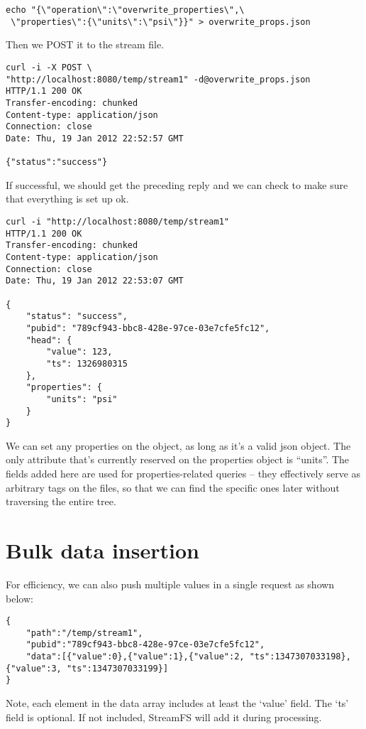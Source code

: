 \begin{lstlisting}
echo "{\"operation\":\"overwrite_properties\",\
 \"properties\":{\"units\":\"psi\"}}" > overwrite_props.json
\end{lstlisting}

Then we POST it to the stream file.

\begin{lstlisting}
curl -i -X POST \
"http://localhost:8080/temp/stream1" -d@overwrite_props.json
HTTP/1.1 200 OK
Transfer-encoding: chunked
Content-type: application/json
Connection: close
Date: Thu, 19 Jan 2012 22:52:57 GMT

{"status":"success"}
\end{lstlisting}

If successful, we should get the preceding reply and we can check to make sure that everything is set up ok.

\begin{lstlisting}
curl -i "http://localhost:8080/temp/stream1"
HTTP/1.1 200 OK
Transfer-encoding: chunked
Content-type: application/json
Connection: close
Date: Thu, 19 Jan 2012 22:53:07 GMT

{
    "status": "success",
    "pubid": "789cf943-bbc8-428e-97ce-03e7cfe5fc12",
    "head": {
        "value": 123,
        "ts": 1326980315
    },
    "properties": {
        "units": "psi"
    }
}
\end{lstlisting}

We can set any properties on the object, as long as it's a valid json object. The only attribute that's currently reserved on the properties object is ``units''. The fields added here are used for properties-related queries -- they effectively serve as arbitrary tags on the files, so that we can find the specific ones later without traversing the entire tree.

\section{Bulk data insertion}

For efficiency, we can also push multiple values in a single request as shown below:

\begin{lstlisting}
{
    "path":"/temp/stream1", 
    "pubid":"789cf943-bbc8-428e-97ce-03e7cfe5fc12",
    "data":[{"value":0},{"value":1},{"value":2, "ts":1347307033198},{"value":3, "ts":1347307033199}]
}
\end{lstlisting}

Note, each element in the data array includes at least the `value' field. The `ts' field is optional. If not included, StreamFS will add it during processing.

